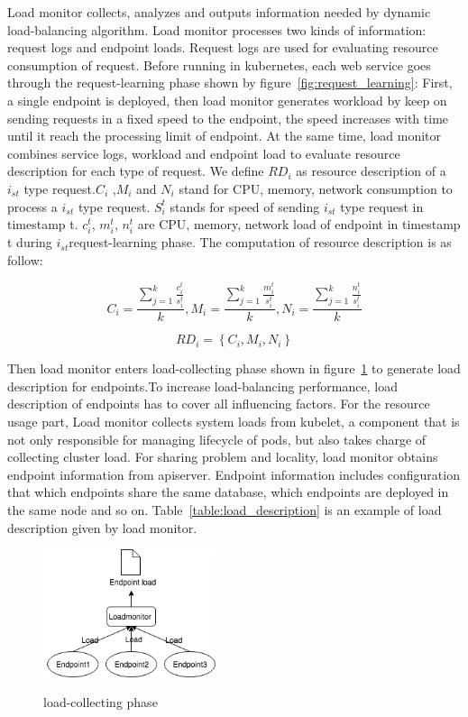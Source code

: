 Load monitor collects, analyzes and outputs information needed by dynamic load-balancing algorithm. Load monitor processes two kinds of information: request logs and endpoint loads.
Request logs are used for evaluating resource consumption of request. Before running in kubernetes, each web service goes through the request-learning phase shown by figure~{\ref{fig:request_learning}}: First, a single endpoint is deployed, then load monitor generates workload by keep on sending requests in a fixed speed to the endpoint, the speed increases with time until it reach the processing limit of endpoint. At the same time, load monitor combines service logs, workload and endpoint load to evaluate resource description for each type of request.
We define $RD_i$ as resource description of  a $i_{st}$ type request.$C_i$ ,$M_i$ and $N_i$ stand for CPU, memory, network consumption to process a $i_{st}$ type request. $S_{i}^{t}$ stands for speed of sending $i_{st}$ type request in timestamp t. $c_{i}^{t}$, $m_{i}^{t}$, $n_{i}^{t}$ are CPU, memory, network load of endpoint in timestamp t during $i_{st}$request-learning phase. The computation of resource description is as follow:

$$ C_i = \frac{\sum_{j=1}^{k}\frac{c_{i}^{t}}{s_{i}^{t}}}{k}, M_i = \frac{\sum_{j=1}^{k}\frac{m_{i}^{t}}{s_{i}^{t}}}{k}, N_i = \frac{\sum_{j=1}^{k}\frac{n_{i}^{t}}{s_{i}^{t}}}{k}$$

$$RD_i = \left \{ C_i, M_i, N_i \right \}$$


Then load monitor enters load-collecting phase shown in figure~{\ref{fig:load_collecting}} to generate load description for endpoints.To increase load-balancing performance, load description of endpoints has to cover all influencing factors. For the resource usage part, Load monitor collects system loads from kubelet, a component that is not only responsible for managing lifecycle of pods, but also takes charge of collecting cluster load. For sharing problem and locality, load monitor obtains endpoint information from apiserver. Endpoint information includes configuration that which endpoints share the same database, which endpoints are deployed in the same node and so on. Table~{\ref{table:load_description}} is an example of load description given by load monitor.
\begin{figure}[htbp]
  \centering
  \includegraphics[width=0.45\textwidth]{images/endpoint_load.png}\\
  \caption{load-collecting phase}
  \label{fig:load_collecting}
\end{figure}

